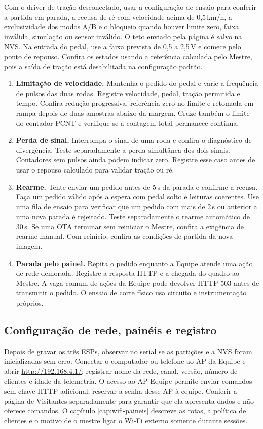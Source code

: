 Com o driver de tração desconectado, usar a configuração de ensaio para conferir a partida em parada, a recusa de ré com velocidade acima de 0,5\,km/h, a exclusividade dos modos A/B e o bloqueio quando houver limite zero, faixa inválida, simulação ou sensor inválido. O teto enviado pela página é salvo na NVS. Na entrada do pedal, use a faixa prevista de 0,5 a 2,5\,V e comece pelo ponto de repouso. Confira os estados usando a referência calculada pelo Mestre, pois a saída de tração está desabilitada na configuração padrão.

\begin{enumerate}
\item \textbf{Limitação de velocidade.} Mantenha o pedido do pedal e varie a frequência de pulsos das duas rodas. Registre velocidade, pedal, tração permitida e tempo. Confira redução progressiva, referência zero no limite e retomada em rampa depois de duas amostras abaixo da margem. Cruze também o limite do contador PCNT e verifique se a contagem total permanece contínua.
\item \textbf{Perda de sinal.} Interrompa o sinal de uma roda e confira o diagnóstico de divergência. Teste separadamente a perda simultânea dos dois sinais. Contadores sem pulsos ainda podem indicar zero. Registre esse caso antes de usar o repouso calculado para validar tração ou ré.
\item \textbf{Rearme.} Tente enviar um pedido antes de 5\,s da parada e confirme a recusa. Faça um pedido válido após a espera com pedal solto e leituras coerentes. Use uma fila de ensaio para verificar que um pedido com mais de 2\,s ou anterior a uma nova parada é rejeitado. Teste separadamente o rearme automático de 30\,s. Se uma OTA terminar sem reiniciar o Mestre, confira a exigência de rearme manual. Com reinício, confira as condições de partida da nova imagem.
\item \textbf{Parada pelo painel.} Repita o pedido enquanto a Equipe atende uma ação de rede demorada. Registre a resposta HTTP e a chegada do quadro ao Mestre. A vaga comum de ações da Equipe pode devolver HTTP 503 antes de transmitir o pedido. O ensaio de corte físico usa circuito e instrumentação próprios.
\end{enumerate}

\subsection{Configuração de rede, painéis e registro}\label{sec:config-operacional}
Depois de gravar os três ESPs, observar no serial se as partições e a NVS foram inicializadas sem erro. Conectar o computador ou telefone ao AP da Equipe e abrir \url{http://192.168.4.1/}; registrar nome da rede, canal, versão, número de clientes e idade da telemetria. O acesso ao AP Equipe permite enviar comandos sem chave HTTP adicional; reservar a senha desse AP à equipe. Conferir a página de Visitantes separadamente para garantir que ela apresenta dados e não oferece comandos. O capítulo \ref{cap:wifi-paineis} descreve as rotas, a política de clientes e o motivo de o mestre ligar o Wi-Fi externo somente durante sessões.

